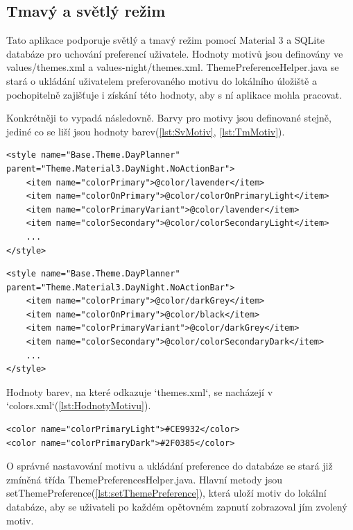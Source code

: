 \newpage

\subsection{Tmavý a světlý režim}
\hspace{14pt} Tato aplikace podporuje světlý a tmavý režim pomocí Material 3 a SQLite databáze pro uchování preferencí uživatele. Hodnoty motivů jsou definovány ve values/themes.xml a values-night/themes.xml. ThemePreferenceHelper.java se stará o ukládání uživatelem preferovaného motivu do lokálního úložiště a pochopitelně zajišťuje i získání této hodnoty, aby s ní aplikace mohla pracovat. 

Konkrétněji to vypadá následovně. Barvy pro motivy jsou definované stejně, jediné co se liší jsou hodnoty barev(\autoref{lst:SvMotiv}, \autoref{lst:TmMotiv}).

\begin{lstlisting}[style=xmlstyle,caption = {Hodnoty světlého motivu},label = {lst:SvMotiv}]
<style name="Base.Theme.DayPlanner" parent="Theme.Material3.DayNight.NoActionBar">
    <item name="colorPrimary">@color/lavender</item>
    <item name="colorOnPrimary">@color/colorOnPrimaryLight</item>
    <item name="colorPrimaryVariant">@color/lavender</item>
    <item name="colorSecondary">@color/colorSecondaryLight</item>
    ...
</style>
\end{lstlisting}

\begin{lstlisting}[style=xmlstyle,caption = {Hodnoty tmavého motivu},label = {lst:TmMotiv}]
<style name="Base.Theme.DayPlanner" parent="Theme.Material3.DayNight.NoActionBar">
    <item name="colorPrimary">@color/darkGrey</item>
    <item name="colorOnPrimary">@color/black</item>
    <item name="colorPrimaryVariant">@color/darkGrey</item>
    <item name="colorSecondary">@color/colorSecondaryDark</item>
    ...
</style>
\end{lstlisting}
\newpage
Hodnoty barev, na které odkazuje `themes.xml`, se nacházejí v `colors.xml`(\autoref{lst:HodnotyMotivu}). 
\begin{lstlisting}[style=xmlstyle,caption = {Hodnoty barev},label = {lst:HodnotyMotivu}]
<color name="colorPrimaryLight">#CE9932</color>
<color name="colorPrimaryDark">#2F0385</color>
\end{lstlisting}

O správné nastavování motivu a ukládání preference do databáze se stará již zmíněná třída ThemePreferencesHelper.java. Hlavní metody jsou setThemePreference(\autoref{lst:setThemePreference}), která uloží motiv do lokální databáze, aby se uživateli po každém opětovném zapnutí zobrazoval jím zvolený motiv.

